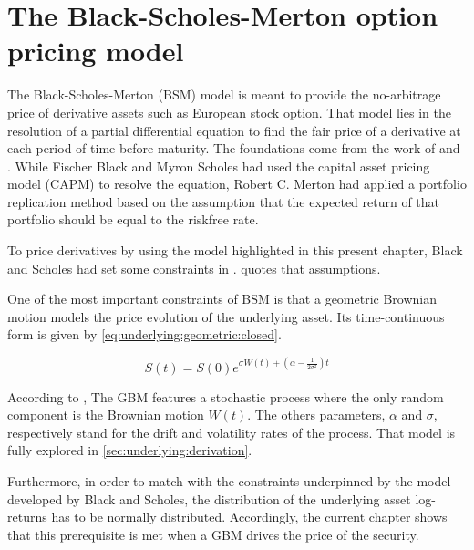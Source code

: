 \documentclass[12pt,a4paper]{report}
\newcommand{\BSM}{Black--Scholes--Merton }
\newcommand{\Bm}{W\left(t\right)}
\newcommand{\St}{S\left(t\right)}
\newcommand{\Si}{S\left(0\right)}
\newcommand{\Scontinuous}{\St = \Si e^{\sigma\Bm + \left(\alpha - \frac{1}{2 \sigma^2}\right)t}}
\begin{document}
%
%
\chapter{The Black-Scholes-Merton option pricing model}
\label{cha:bsm}

The Black-Scholes-Merton (BSM) model is meant to provide the no-arbitrage price of derivative assets such as European stock option. 
That model lies in the resolution of a partial differential equation to find the fair price of a derivative at each period of time before maturity.
The foundations come from the work of \citet{bs} and \citet{merton73}. 
While Fischer Black and Myron Scholes had used the capital asset pricing model (CAPM) to resolve the equation, Robert C. Merton had applied a portfolio replication method based on the assumption that the expected return of that portfolio should be equal to the riskfree rate. 



To price derivatives by using the model highlighted in this present chapter, Black and Scholes had set some constraints in \citet{bs}. 
 quotes that assumptions. 


  
One of the most important constraints of BSM is that a geometric Brownian motion models the price evolution of the underlying asset. Its time-continuous form is given by  \cref{eq:underlying:geometric:closed}.


\begin{center}
  \begin{equation}
    \Scontinuous
    \label{eq:underlying:geometric:closed}
  \end{equation}
\end{center}
According to \citet{shreve}, The  GBM features a stochastic process where the only random component is the Brownian motion $\Bm$. 
The others parameters, $\alpha$ and $\sigma$,  respectively stand for the drift and volatility rates of the process.
That model is fully explored in \cref{sec:underlying:derivation}.


 
Furthermore, in order to match with the constraints underpinned by the model developed by Black and Scholes, the distribution of the underlying asset log-returns has to be normally distributed.
Accordingly, the current chapter shows that this prerequisite is met when a GBM drives the price of the security.
\end{document}
